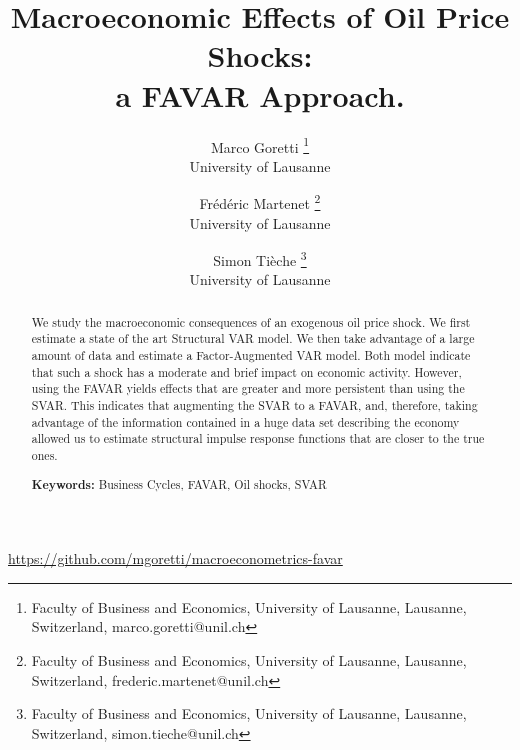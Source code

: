 \documentclass[11pt,a4paper]{article}
\begin{document}
	
\title{{\Huge Macroeconomic Effects of Oil Price Shocks: \\
		\vspace{0.5em}
		 a FAVAR Approach.}
	\vspace{3em}}

\author{{\LARGE Marco Goretti
	\footnote{Faculty of Business and Economics, University of Lausanne, Lausanne, Switzerland, marco.goretti@unil.ch}}
	\\ {\large University of Lausanne  }
	\and {\LARGE Frédéric Martenet
	\footnote{Faculty of Business and Economics, University of Lausanne, Lausanne, Switzerland, frederic.martenet@unil.ch}} 
	\\ {\large University of Lausanne  }
	\and {\LARGE Simon Tièche
	\footnote{Faculty of Business and Economics, University of Lausanne, Lausanne, Switzerland, simon.tieche@unil.ch}}
	\\ {\large University of Lausanne  }
}
	
\date{\vspace{3em}{\Large \today}}

\maketitle

\thispagestyle{empty}

\vspace{3em}
\begin{abstract}
	{\noindent\large 
		We study the macroeconomic consequences of an exogenous oil price shock. We first estimate a state of the art Structural VAR model. We then take advantage of a large amount of data and estimate a Factor-Augmented VAR model.
		Both model indicate that such a shock has a moderate and brief impact on economic activity.
		However, using the FAVAR yields effects that are greater and more persistent than using the SVAR. This indicates that augmenting the SVAR to a FAVAR, and, therefore, taking advantage of the information contained in a huge data set describing the economy allowed us to estimate structural impulse response functions that are closer to the true ones. 
		
		{\large \vspace{3em} \noindent\textbf{Keywords:} Business Cycles, FAVAR, Oil shocks,   SVAR}

	}
\end{abstract}




\vspace{3.5cm}
\begin{center}
\url{https://github.com/mgoretti/macroeconometrics-favar}
\end{center}
\end{document}
